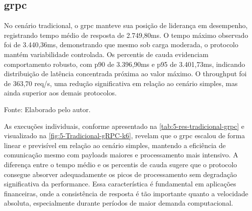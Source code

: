 \subsection{\acrshort{grpc}}

No cenário tradicional, o \gls{grpc} manteve sua posição de liderança em desempenho, registrando tempo médio de resposta de 2.749,80ms. O tempo máximo observado foi de 3.440,36ms, demonstrando que mesmo sob carga moderada, o protocolo mantém variabilidade controlada. Os percentis de cauda evidenciam comportamento robusto, com p90 de 3.396,90ms e p95 de 3.401,73ms, indicando distribuição de latência concentrada próxima ao valor máximo. O throughput foi de 363,70 req/s, uma redução significativa em relação ao cenário simples, mas ainda superior aos demais protocolos.

\begin{table}[H]
\centering
\caption{\gls{grpc} comparado com os demais protocolos — Cenário Tradicional (Thrift/\gls{rest} em $\Delta$\% vs \gls{grpc})}
\label{tab:5-res-tradicional-grpc}
{\par \raggedright \footnotesize Fonte: Elaborado pelo autor.\par}
\end{table}


As execuções individuais, conforme apresentado na \autoref{tab:5-res-tradicional-grpc} e visualizado na \autoref{fig:5-Tradicional-gRPC-k6}, revelam que o \gls{grpc} escalou de forma linear e previsível em relação ao cenário simples, mantendo a eficiência de comunicação mesmo com payloads maiores e processamento mais intensivo. A diferença entre o tempo médio e os percentis de cauda sugere que o protocolo consegue absorver adequadamente os picos de processamento sem degradação significativa da performance. Essa característica é fundamental em aplicações financeiras, onde a consistência de resposta é tão importante quanto a velocidade absoluta, especialmente durante períodos de maior demanda computacional.

